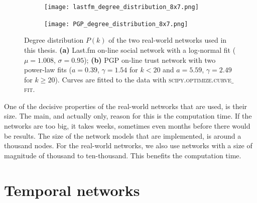 \documentclass[11 pt , letterpaper , twoside , openright]{book}
\begin{document}
\begin{figure}[H]
  \begin{subfigure}[b]{0.49\textwidth}
    \caption{}
    \texttt{[image: lastfm\_degree\_distribution\_8x7.png]}
    \label{deg_distr_lastfm}
  \end{subfigure}
  \begin{subfigure}[b]{0.49\textwidth}
    \caption{}
    \texttt{[image: PGP\_degree\_distribution\_8x7.png]}
    \label{deg_distr_pgp}
  \end{subfigure}
  \captionsetup{format=plain}
  \caption[Degree distribution $P(k)$ of the two real-world networks used in this thesis.]{Degree distribution $P(k)$ of the two real-world networks used in this thesis. \textbf{(a)} Last.fm on-line social network with a log-normal fit ($\mu = 1.008$, $\sigma = 0.95$); \textbf{(b)} PGP on-line trust network with two power-law fits ($a = 0.39$, $\gamma = 1.54$ for $k < 20$ and $a = 5.59$, $\gamma = 2.49$ for $k \geqslant 20$). Curves are fitted to the data with \textsc{scipy.optimize.curve$\_$fit}.}
\label{deg_distr_real_network}
\end{figure}
\noindent
One of the decisive properties of the real-world networks that are used, is their size. The main, and actually only, reason for this is the computation time. If the networks are too big, it takes weeks, sometimes even months before there would be results. The size of the network models that are implemented, is around a thousand nodes. For the real-world networks, we also use networks with a size of magnitude of thousand to ten-thousand. This benefits the computation time. 

\section{Temporal networks}
\end{document}
